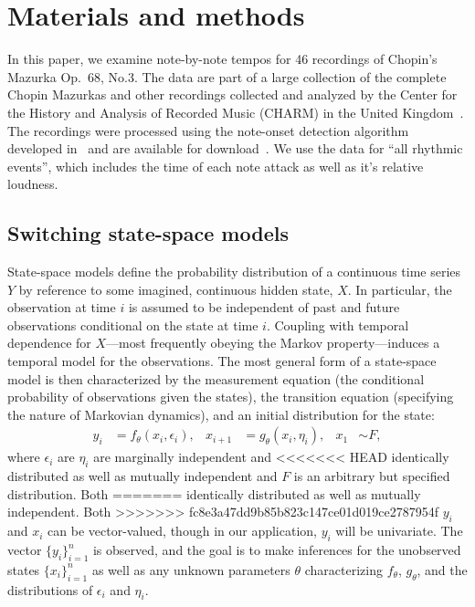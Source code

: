 \documentclass[aoas]{imsart}
\begin{document}
\section{Materials and methods}
\label{sec:materials-methods}





In this paper, we examine note-by-note tempos for 46 recordings of
Chopin's Mazurka Op.\ 68, No.3. The data are part of a large
collection of the complete Chopin Mazurkas and other recordings
collected and analyzed by the Center for the History and Analysis of
Recorded Music (CHARM) in the United Kingdom~\citep{CHARM-site}. The
recordings were processed using the note-onset detection algorithm
developed in~\citep{Earis2007} and are available for
download~\citep{Earis2009}. We use the data for ``all rhythmic
events'', which includes the time of each note attack as well as it's
relative loudness.

\subsection{Switching state-space models}

State-space models define the probability distribution of a continuous
time series $Y$ by reference to some imagined, continuous hidden state, $X$. In
particular, the observation at time $i$ is assumed to be
independent of past and future observations conditional on the state
at time $i$. Coupling with temporal dependence for $X$---most
frequently obeying the Markov property---induces a temporal model for
the observations.  The most general form of a state-space model is
then characterized by the 
measurement equation (the conditional probability of observations
given the states),
the transition equation (specifying the nature of Markovian
dynamics), and an initial distribution for the state: 
\begin{equation}
\begin{aligned}
  y_i &= f_\theta(x_i,\epsilon_i), &
  x_{i+1} &= g_\theta(x_i,\eta_i), &
  x_1 &\sim F,
\end{aligned}
\label{eq:ssmod}
\end{equation}
where $\epsilon_i$ are $\eta_i$ are marginally independent and
<<<<<<< HEAD
identically distributed  as well as mutually independent and $F$ is
an arbitrary but specified distribution. Both
=======
identically distributed  as well as mutually independent. Both
>>>>>>> fc8e3a47dd9b85b823c147ce01d019ce2787954f
$y_i$ and $x_i$ can be vector-valued, though in our
application, $y_i$ will be univariate. The
vector $\{y_i\}_{i=1}^n$ is observed, and the goal is to make
inferences for the unobserved states $\{x_i\}_{i=1}^n$ as well as any
unknown parameters $\theta$ characterizing $f_\theta$, $g_\theta$, and
the distributions of $\epsilon_i$ and $\eta_i$.
\end{document}
